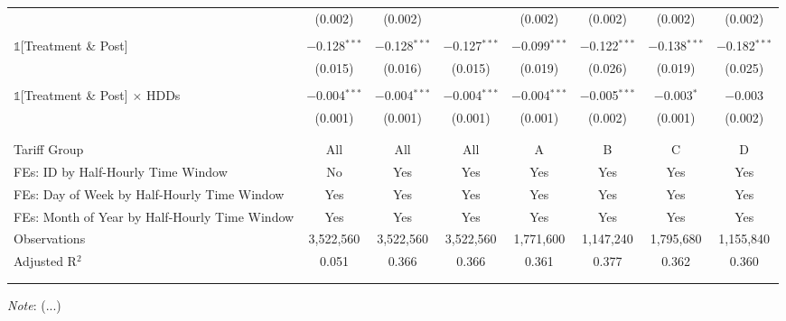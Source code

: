 \begin{table}[!th]
\begin{adjustbox}{scale = 0.8}
\begin{tabular}{@{\extracolsep{5pt}}lccccccc}
& (0.002) & (0.002) & & (0.002) & (0.002) & (0.002) & (0.002) \\
& & & & & & & \\
$\mathbb{1}$[Treatment \& Post] & $-$0.128$^{***}$ & $-$0.128$^{***}$ & $-$0.127$^{***}$ & $-$0.099$^{***}$ & $-$0.122$^{***}$ & $-$0.138$^{***}$ & $-$0.182$^{***}$ \\
& (0.015) & (0.016) & (0.015) & (0.019) & (0.026) & (0.019) & (0.025) \\
& & & & & & & \\
$\mathbb{1}$[Treatment \& Post] $\times$ HDDs & $-$0.004$^{***}$ & $-$0.004$^{***}$ & $-$0.004$^{***}$ & $-$0.004$^{***}$ & $-$0.005$^{***}$ & $-$0.003$^{*}$ & $-$0.003 \\
& (0.001) & (0.001) & (0.001) & (0.001) & (0.002) & (0.001) & (0.002) \\
& & & & & & & \\
\hline
\\[-2.0ex]
Tariff Group & All & All & All & A & B & C & D \\
FEs: ID by Half-Hourly Time Window & No & Yes & Yes & Yes & Yes & Yes & Yes \\
FEs: Day of Week by Half-Hourly Time Window & Yes & Yes & Yes & Yes & Yes & Yes & Yes \\
FEs: Month of Year by Half-Hourly Time Window & Yes & Yes & Yes & Yes & Yes & Yes & Yes \\
Observations & 3,522,560 & 3,522,560 & 3,522,560 & 1,771,600 & 1,147,240 & 1,795,680 & 1,155,840 \\
Adjusted R$^{2}$ & 0.051 & 0.366 & 0.366 & 0.361 & 0.377 & 0.362 & 0.360 \\
\\[-2.0ex]
\hline \hline
\\[-4.5ex]
\end{tabular}
\end{adjustbox}
\begin{tablenotes}
    \footnotesize
    \textit{Note}: (...)  %
\end{tablenotes}
\label{Table:}  %
\end{table}
